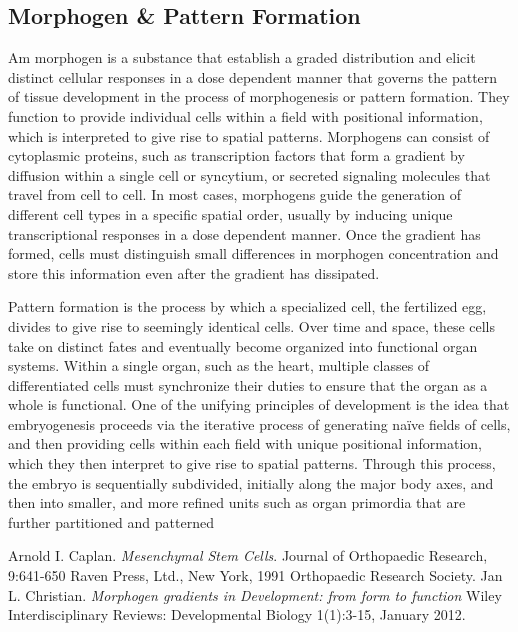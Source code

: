 \documentclass[12pt]{article}
\begin{document}
\subsection{Morphogen \& Pattern Formation}


Am morphogen is a substance that establish a graded distribution and elicit distinct cellular responses in a dose dependent manner that governs the pattern of tissue development in the process of morphogenesis or pattern formation. 
They function to provide individual cells within a field with positional information, which is interpreted to give rise to spatial patterns.
Morphogens can consist of cytoplasmic proteins, such as transcription factors that form a gradient by diffusion within a single cell or syncytium, or secreted signaling molecules that travel from cell to cell. 
In most cases, morphogens guide the generation of different cell types in a specific spatial order, usually by inducing unique transcriptional responses in a dose dependent manner.
Once the gradient has formed, cells must distinguish small differences in morphogen concentration and store this information even after the gradient has dissipated.

Pattern formation is the process by which a specialized cell, the fertilized egg, divides to give rise to seemingly identical cells. 
Over time and space, these cells take on distinct fates and eventually become organized into functional organ systems. 
Within a single organ, such as the heart, multiple classes of differentiated cells must synchronize their duties to ensure that the organ as a whole is functional. 
One of the unifying principles of development is the idea that embryogenesis proceeds via the iterative process of generating naïve fields of cells, and then providing cells within each field with unique positional information, which they then interpret to give rise to spatial patterns. 
Through this process, the embryo is sequentially subdivided, initially along the major body axes, and then into smaller, and more refined units such as organ primordia that are further partitioned and patterned



\begin{thebibliography}{}
	Arnold I. Caplan. 
	\textit{Mesenchymal Stem Cells}. 
	Journal of Orthopaedic Research, 9:641-650 Raven Press, Ltd., New York, 1991 Orthopaedic Research Society.
	Jan L. Christian.
	\textit{Morphogen gradients in Development: from form to function}
	 Wiley Interdisciplinary Reviews: Developmental Biology 1(1):3-15, January 2012.

\end{thebibliography}
\end{document}
